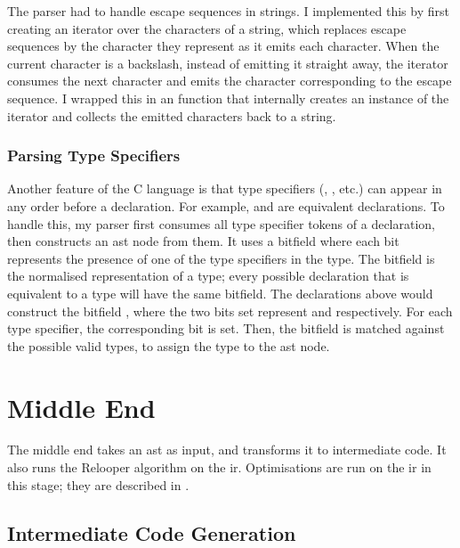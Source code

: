 \documentclass[00-main.tex]{subfiles}
\begin{document}
The parser had to handle escape sequences in strings.
I implemented this by first creating an iterator over the characters of a string, which replaces escape sequences by the character they represent as it emits each character.
When the current character is a backslash, instead of emitting it straight away, the iterator consumes the next character and emits the character corresponding to the escape sequence.
I wrapped this in an  function that internally creates an instance of the iterator and collects the emitted characters back to a string.

\subsubsection{Parsing Type Specifiers}

Another feature of the C language is that type specifiers (, , etc.) can appear in any order before a declaration.
For example,  and  are equivalent declarations.
To handle this, my parser first consumes all type specifier tokens of a declaration, then constructs an  \gls{ast} node from them.
It uses a bitfield where each bit represents the presence of one of the type specifiers in the type.
The bitfield is the normalised representation of a type; every possible declaration that is equivalent to a type will have the same bitfield.
The declarations above would construct the bitfield , where the two bits set represent  and  respectively.
For each type specifier, the corresponding bit is set.
Then, the bitfield is matched against the possible valid types, to assign the type to the \gls{ast} node.


\section{Middle End}

The middle end takes an \gls{ast} as input, and transforms it to intermediate code.
It also runs the Relooper algorithm on the \gls{ir}.
Optimisations are run on the \gls{ir} in this stage; they are described in .

\subsection{Intermediate Code Generation}
\end{document}

